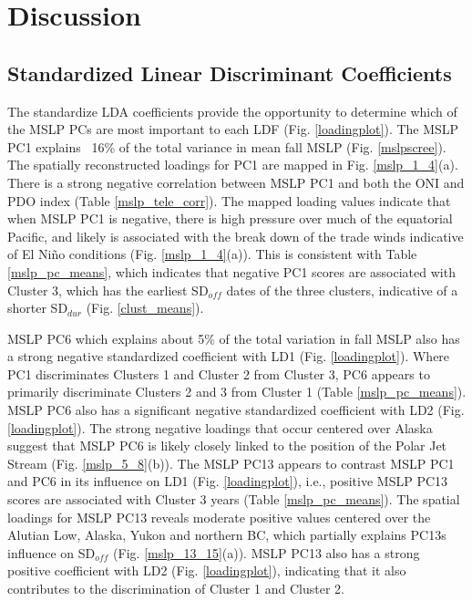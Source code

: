 \documentclass{tATO2e}
\newcommand{\sdoff}{SD$_{off}$}
\newcommand{\sddur}{SD$_{dur}$}
\begin{document}
\section{Discussion}

\subsection{Standardized Linear Discriminant Coefficients}
The standardize LDA coefficients provide the opportunity to determine which of the MSLP PCs are most important to each LDF (Fig. \ref{loadingplot}). The MSLP PC1 explains ~16\% of the total variance in mean fall MSLP (Fig. \ref{mslpscree}). The spatially reconstructed loadings for PC1 are mapped in Fig. \ref{mslp_1_4}(a). There is a strong negative correlation between MSLP PC1 and both the ONI and PDO index (Table \ref{mslp_tele_corr}). The mapped loading values indicate that when MSLP PC1 is negative, there is high pressure over much of the equatorial Pacific, and likely is associated with the break down of the trade winds indicative of El Ni\~{n}o conditions (Fig. \ref{mslp_1_4}(a)). This is consistent with Table \ref{mslp_pc_means}, which indicates that negative PC1 scores are associated with Cluster 3, which has the earliest \sdoff{} dates of the three clusters, indicative of a shorter \sddur{} (Fig. \ref{clust_means}).
\par
MSLP PC6 which explains about 5\% of the total variation in fall MSLP also has a strong negative standardized coefficient with LD1 (Fig. \ref{loadingplot}). Where PC1 discriminates Clusters 1 and Cluster 2 from Cluster 3, PC6 appears to primarily discriminate Clusters 2 and 3 from Cluster 1 (Table \ref{mslp_pc_means}). MSLP PC6 also has a significant negative standardized coefficient with LD2 (Fig. \ref{loadingplot}). The strong negative loadings that occur centered over Alaska suggest that MSLP PC6 is likely closely linked to the position of the Polar Jet Stream (Fig. \ref{mslp_5_8}(b)). The MSLP PC13 appears to contrast MSLP PC1 and PC6 in its influence on LD1 (Fig. \ref{loadingplot}), i.e., positive MSLP PC13 scores are associated with Cluster 3 years (Table \ref{mslp_pc_means}). The spatial loadings for MSLP PC13 reveals moderate positive values centered over the Alutian Low, Alaska, Yukon and northern BC, which partially explains PC13s influence on \sdoff{} (Fig. \ref{mslp_13_15}(a)). MSLP PC13 also has a strong positive coefficient with LD2 (Fig. \ref{loadingplot}), indicating that it also contributes to the discrimination of Cluster 1 and Cluster 2.
\par
\end{document}
